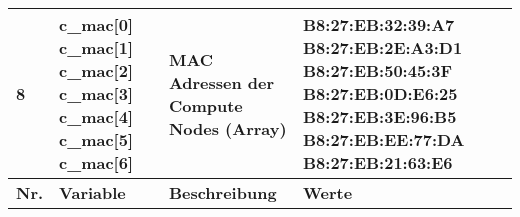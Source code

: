 \begin{longtable}{| p{0.5cm} | p{3cm} | p{8.5cm} | p{4cm} |}
8 &  c\_mac[0] \newline  c\_mac[1] \newline c\_mac[2] \newline c\_mac[3] \newline c\_mac[4] \newline c\_mac[5] \newline c\_mac[6]   & MAC Adressen der Compute Nodes (Array) & B8:27:EB:32:39:A7 \newline B8:27:EB:2E:A3:D1 \newline B8:27:EB:50:45:3F \newline B8:27:EB:0D:E6:25 \newline B8:27:EB:3E:96:B5 \newline B8:27:EB:EE:77:DA \newline B8:27:EB:21:63:E6 \\\hline 
\rowcolor{heading} \textbf{Nr.} & \textbf{Variable} & \textbf{Beschreibung} &\textbf{Werte} \\\hline

\end{longtable}
